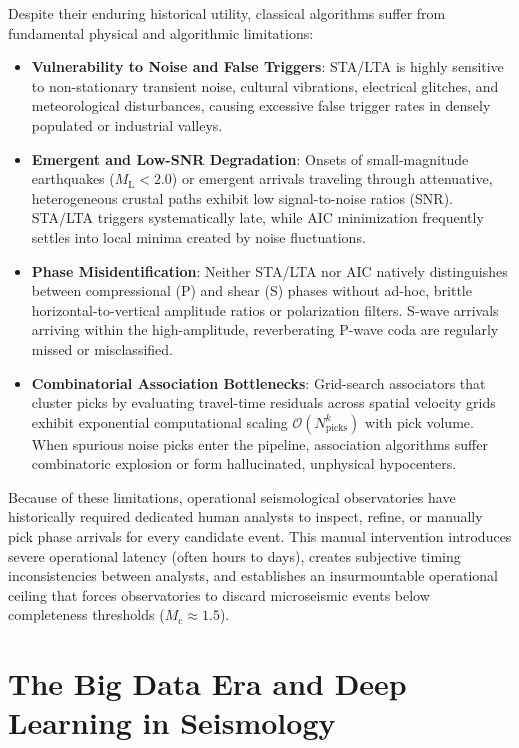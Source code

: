 Despite their enduring historical utility, classical algorithms suffer from fundamental physical and algorithmic limitations:
\begin{itemize}
  \item \textbf{Vulnerability to Noise and False Triggers}: STA/LTA is highly sensitive to non-stationary transient noise, cultural vibrations, electrical glitches, and meteorological disturbances, causing excessive false trigger rates in densely populated or industrial valleys.
  \item \textbf{Emergent and Low-SNR Degradation}: Onsets of small-magnitude earthquakes ($M_{\mathrm{L}} < 2.0$) or emergent arrivals traveling through attenuative, heterogeneous crustal paths exhibit low signal-to-noise ratios (\ac{SNR}). STA/LTA triggers systematically late, while AIC minimization frequently settles into local minima created by noise fluctuations.
  \item \textbf{Phase Misidentification}: Neither STA/LTA nor AIC natively distinguishes between compressional (P) and shear (S) phases without ad-hoc, brittle horizontal-to-vertical amplitude ratios or polarization filters. S-wave arrivals arriving within the high-amplitude, reverberating P-wave coda are regularly missed or misclassified.
  \item \textbf{Combinatorial Association Bottlenecks}: Grid-search associators that cluster picks by evaluating travel-time residuals across spatial velocity grids exhibit exponential computational scaling $\mathcal{O}(N_{\mathrm{picks}}^k)$ with pick volume. When spurious noise picks enter the pipeline, association algorithms suffer combinatoric explosion or form hallucinated, unphysical hypocenters.
\end{itemize}

Because of these limitations, operational seismological observatories have historically required dedicated human analysts to inspect, refine, or manually pick phase arrivals for every candidate event. This manual intervention introduces severe operational latency (often hours to days), creates subjective timing inconsistencies between analysts, and establishes an insurmountable operational ceiling that forces observatories to discard microseismic events below completeness thresholds ($M_{\mathrm{c}} \approx 1.5$).

\section{The Big Data Era and Deep Learning in Seismology}
\label{sec:dl_seismology}

